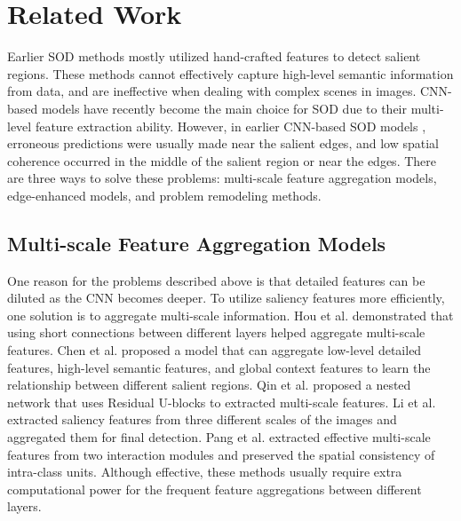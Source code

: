 \documentclass[review]{cvpr}
\begin{document}
\section{Related Work}
Earlier SOD methods \cite{tradition1,tradition_PR2,tradition2} mostly utilized hand-crafted features to detect salient regions. These methods cannot effectively capture high-level semantic information from data, and are ineffective when dealing with complex scenes in images. CNN-based models have recently become the main choice for SOD due to their multi-level feature extraction ability. However, in earlier CNN-based SOD models \cite{DSS,old2}, erroneous predictions were usually made near the salient edges, and low spatial coherence occurred in the middle of the salient region or near the edges. There are three ways to solve these problems: multi-scale feature aggregation models, edge-enhanced models, and problem remodeling methods.
\subsection{Multi-scale Feature Aggregation Models}

One reason for the problems described above is that detailed features can be diluted as the CNN becomes deeper. To utilize saliency features more efficiently, one solution is to aggregate multi-scale information. %
Hou et al. \cite{DSS} demonstrated that using short connections between different layers helped aggregate multi-scale features. Chen et al. \cite{gcpa} proposed a model that can aggregate low-level detailed features, high-level semantic features, and global context features to learn the relationship between different salient regions. Qin et al. \cite{U2-Net} proposed a nested network that uses Residual U-blocks to extracted multi-scale features. Li et al. \cite{HKU} extracted saliency features from three different scales of the images and aggregated them for final detection. Pang et al. \cite{MINet} extracted effective multi-scale features from two interaction modules and preserved the spatial consistency of intra-class units. Although effective, these methods usually require extra computational power for the frequent feature aggregations between different layers. 
\end{document}
